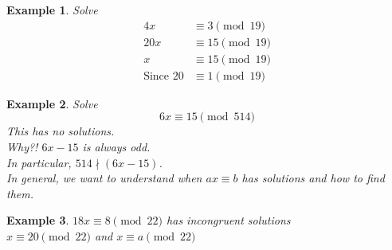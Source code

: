 \documentclass[letterpaper]{article}
\newtheorem{example}{Example}[theorem]
\begin{document}
    \begin{example}
        Solve
        \begin{align*}
            4x &\equiv 3 \pmod{19} \\
            20x &\equiv 15 \pmod{19} \\
            x &\equiv 15 \pmod{19} \\
            \text{Since } 20 &\equiv 1 \pmod{19}
        \end{align*}
    \end{example}

    \begin{example}
        Solve
        \[
            6x\equiv 15 \pmod{514}
        \]
        This has no solutions. \\
        Why?! $6x-15$ is always odd. \\
        In particular, $514\nmid (6x-15)$. \\
        In general, we want to understand when $ax\equiv b$ has solutions 
        and how to find them.
    \end{example}

    \begin{example}
        $18x\equiv 8 \pmod{22}$ has incongruent solutions \\
        $x\equiv 20 \pmod{22}$ and $x\equiv a\pmod{22}$
    \end{example}
\end{document}
